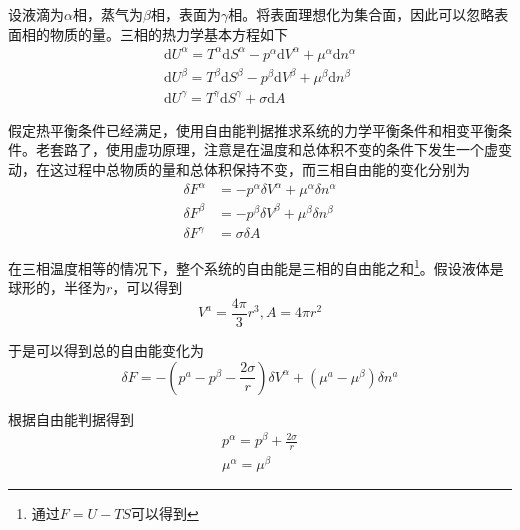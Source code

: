 \documentclass[UTF8]{ctexart}
\begin{document}
	设液滴为$ \alpha $相，蒸气为$ \beta $相，表面为$ \gamma $相。将表面理想化为集合面，因此可以忽略表面相的物质的量。三相的热力学基本方程如下
	\begin{equation}
	\begin{array}{l}{\mathrm{d} U^{\alpha}=T^{\alpha} \mathrm{d} S^{\alpha}-p^{\alpha} \mathrm{d} V^{\alpha}+\mu^{\alpha} \mathrm{d} n^{\alpha}} \\ {\mathrm{d} U^{\beta}=T^{\beta} \mathrm{d} S^{\beta}-p^{\beta} \mathrm{d} V^{\beta}+\mu^{\beta} \mathrm{d} n^{\beta}} \\ {\mathrm{d} U^{\gamma}=T^{\gamma} \mathrm{d} S^{\gamma}+\sigma \mathrm{d} A}\end{array}
	\end{equation}
	
\noindent 假定热平衡条件已经满足，使用自由能判据推求系统的力学平衡条件和相变平衡条件。老套路了，使用虚功原理，注意是在温度和总体积不变的条件下发生一个虚变动，在这过程中总物质的量和总体积保持不变，而三相自由能的变化分别为
	\begin{equation}
	\begin{aligned} \delta F^{\alpha} &=-p^{\alpha} \delta V^{\alpha}+\mu^{\alpha} \delta n^{\alpha} \\ \delta F^{\beta} &=-p^{\beta} \delta V^{\beta}+\mu^{\beta} \delta n^{\beta} \\ \delta F^{\gamma} &=\sigma \delta A \end{aligned}
	\end{equation}
	
\noindent 在三相温度相等的情况下，整个系统的自由能是三相的自由能之和\footnote{通过$ F = U - TS $可以得到}。假设液体是球形的，半径为$ r $，可以得到
	\begin{equation}
	V^{a}=\frac{4 \pi}{3} r^{3}, A=4 \pi r^{2}
	\end{equation}
	
\noindent 于是可以得到总的自由能变化为
\begin{equation}
\delta F=-\left(p^{a}-p^{\beta}-\frac{2 \sigma}{r}\right) \delta V^{\alpha}+\left(\mu^{a}-\mu^{\beta}\right) \delta n^{a}
\end{equation}

\noindent 根据自由能判据得到
\begin{equation}
\begin{array}{c}{p^{\alpha}=p^{\beta}+\frac{2 \sigma}{r}} \\ {\mu^{\alpha}=\mu^{\beta}}\end{array}
\end{equation}
\end{document}
